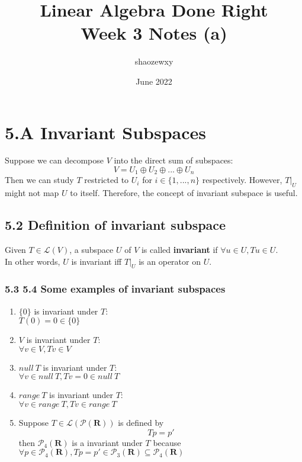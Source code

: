 \documentclass{article}
\title{Linear Algebra Done Right\\
\large{Week 3 Notes (a)}}
\author{shaozewxy }
\date{June 2022}
\begin{document}
\maketitle

\setcounter{secnumdepth}{0}
\section*{5.A Invariant Subspaces}
Suppose we can decompose $V$ into the direct sum of subspaces:
\begin{equation*}
    V = U_1 \oplus U_2 \oplus ... \oplus U_n
\end{equation*}
Then we can study $T$ restricted to $U_i$ for $i \in \{1, ..., n\}$ respectively. However, $T|_{U}$ might not map $U$ to itself. Therefore, the concept of invariant subspace is useful.
\subsection*{5.2 Definition of invariant subspace}
Given $T \in \mathcal{L}(V)$, a subspace $U$ of $V$ is called \textbf{invariant} if $\forall u \in U, Tu \in U$.\\
In other words, $U$ is invariant iff $T|_U$ is an operator on $U$.
\subsubsection*{5.3 5.4 Some examples of invariant subspaces}
\begin{enumerate}
    \item $\{0\}$ is invariant under $T$:\\
    $T(0) = 0 \in \{0\}$
    \item $V$ is invariant under $T$:\\
    $\forall v \in V, Tv \in V$
    \item $null\ T$ is invariant under $T$:\\
    $\forall v \in null\ T, Tv = 0 \in null\ T$
    \item $range\ T$ is invariant under $T$:\\
    $\forall v \in range\ T, Tv \in range\ T$
    \item Suppose $T \in \mathcal{L}(\mathcal{P}(\mathbf{R}))$ is defined by
    \begin{equation*}
        Tp = p'
    \end{equation*}
    then $\mathcal{P}_4(\mathbf{R})$ is a invariant under $T$ because $\forall p \in \mathcal{P}_4(\mathbf{R}), Tp = p' \in \mathcal{P}_3(\mathbf{R}) \subseteq \mathcal{P}_4(\mathbf{R})$
\end{enumerate}
\end{document}
